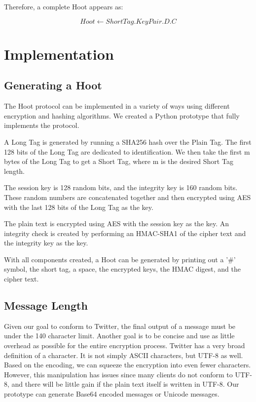 \documentclass{acm_proc_article-sp}
\begin{document}
Therefore, a complete Hoot appears as:

\begin{equation}
	Hoot \leftarrow ShortTag.KeyPair.D.C
\end{equation}

\section{Implementation}

\subsection{Generating a Hoot}

The Hoot protocol can be implemented in a variety of ways using different encryption and hashing algorithms. We created a Python prototype that fully implements the protocol.

A Long Tag is generated by running a SHA256 hash over the Plain Tag. The first 128 bits of the Long Tag are dedicated to identification. We then take the first m bytes of the Long Tag to get a Short Tag, where m is the desired Short Tag length.

The session key is 128 random bits, and the integrity key is 160 random bits. These random numbers are concatenated together and then encrypted using AES with the last 128 bits of the Long Tag as the key.

The plain text is encrypted using AES with the session key as the key. An integrity check is created by performing an HMAC-SHA1 of the cipher text and the integrity key as the key.

With all components created, a Hoot can be generated by printing out a '\#' symbol,  the short tag, a space, the encrypted keys, the HMAC digest, and the cipher text.

\subsection{Message Length}

Given our goal to conform to Twitter, the final output of a message must be under the 140 character limit. Another goal is to be concise and use as little overhead as possible for the entire encryption process. Twitter has a very broad definition of a character. It is not simply ASCII characters, but UTF-8 as well. Based on the encoding, we can squeeze the encryption into even fewer characters. However, this manipulation has issues since many clients do not conform to UTF-8, and there will be little gain if the plain text itself is written in UTF-8. Our prototype can generate Base64 encoded messages or Unicode messages.
\end{document}
